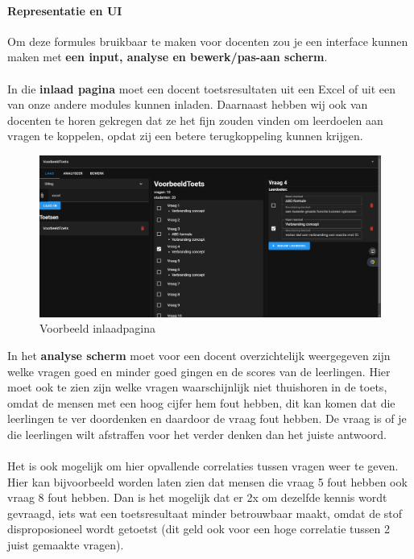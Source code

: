 \documentclass[12pt]{article}
\begin{document}
\pagebreak
\begin{multicols}{2}
\paragraph*{Representatie en UI} Om deze formules bruikbaar te maken voor docenten zou je een interface kunnen maken met \textbf{een input, analyse en bewerk/pas-aan scherm}.\\\\
In die \textbf{inlaad pagina} moet een docent toetsresultaten uit een Excel of uit een van onze andere modules kunnen inladen. Daarnaast hebben wij ook van docenten te horen gekregen dat ze het fijn zouden vinden om leerdoelen aan vragen te koppelen, opdat zij een betere terugkoppeling kunnen krijgen.%
\begin{figure}[H]
    \centering
    \includegraphics[width=1\linewidth]{./images/methoden/analyseren/ui/inlaad-pagina.png}
    \caption{Voorbeeld inlaadpagina}
    \label{fig:example-load-page}
\end{figure}
\noindent In het \textbf{analyse scherm} moet voor een docent overzichtelijk weergegeven zijn welke vragen goed en minder goed gingen en de scores van de leerlingen. Hier moet ook te zien zijn welke vragen waarschijnlijk niet thuishoren in de toets, omdat de mensen met een hoog cijfer hem fout hebben, dit kan komen dat die leerlingen te ver doordenken en daardoor de vraag fout hebben. De vraag is of je die leerlingen wilt afstraffen voor het verder denken dan het juiste antwoord. \\
\\
Het is ook mogelijk om hier opvallende correlaties tussen vragen weer te geven. Hier kan bijvoorbeeld worden laten zien dat mensen die vraag 5 fout hebben ook vraag 8 fout hebben. Dan is het mogelijk dat er 2x om dezelfde kennis wordt gevraagd, iets wat een toetsresultaat minder betrouwbaar maakt, omdat de stof disproposioneel wordt getoetst (dit geld ook voor een hoge correlatie tussen 2 juist gemaakte vragen). \\

\end{multicols}
\end{document}

